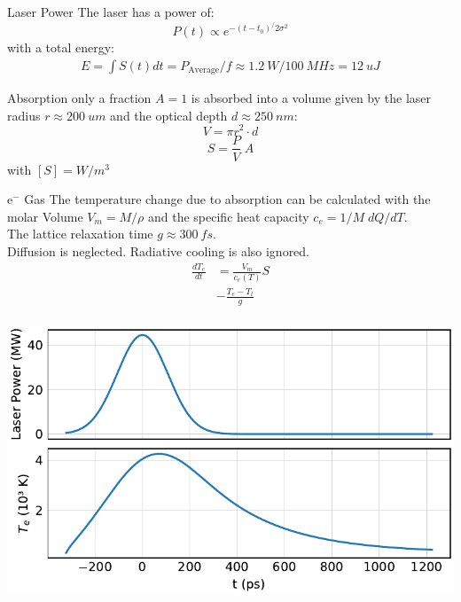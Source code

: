 \begin{frame}{Laser Power}
	The laser has a power of:
	$$P(t) \propto e^{-(t-t_0)^ / 2\sigma^2}$$
	with a total energy:
	\begin{align*}
		E = \int S(t) dt = P_\text{Average} / f \approx \SI{1.2}{W} / \SI{100}{MHz} = \SI{12}{uJ}
	\end{align*}
\end{frame}

\begin{frame}{Absorption}
	only a fraction $A=1$ is absorbed into a volume given by the laser radius $r\approx \SI{200}{um}$ and the optical depth $d\approx \SI{250}{nm}$:
	$$V=\pi r^2 \cdot d$$
	$$S = \frac{P}{V}\; A$$
	with $[S] = W/m^3$  
\end{frame}

\begin{frame}{e$^-$ Gas}
	The temperature change due to absorption can be calculated with the molar Volume $V_m = M / \rho$ and  the specific heat capacity $c_e= 1/M \; dQ/dT$.\\
	The lattice relaxation time $g\approx\SI{300}{fs}$. \\
	Diffusion is neglected.
	Radiative cooling is also ignored.
	\begin{align*}
		\frac{dT_e}{dt}
		&= \frac{V_m}{c_e(T)}S\\
		&- \frac{T_e - T_l}{g}\\ 
	\end{align*}
\end{frame}


\begin{frame}
	\centering
	\includegraphics{../model/figures/temperature profile.pdf}
\end{frame}

